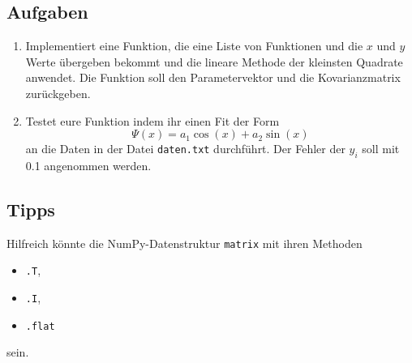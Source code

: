 \documentclass{scrartcl}
\begin{document}
\subsection*{Aufgaben}
\begin{enumerate}
    \item Implementiert eine Funktion, die eine Liste von Funktionen und die $x$ und $y$ Werte übergeben bekommt und die lineare Methode der kleinsten Quadrate anwendet. 
        Die Funktion soll den Parametervektor und die Kovarianzmatrix zurückgeben.
    \item Testet eure Funktion indem ihr einen Fit der Form
        \begin{equation}
            \Psi(x) = a_1 \cos(x) + a_2 \sin(x)
        \end{equation}
        an die Daten in der Datei \texttt{daten.txt} durchführt.
        Der Fehler der $y_i$ soll mit \num{0.1} angenommen werden.
\end{enumerate}

\subsection*{Tipps}
Hilfreich könnte die NumPy-Datenstruktur \texttt{matrix} mit ihren Methoden 
\begin{itemize}
    \item \texttt{.T},
    \item \texttt{.I},
    \item \texttt{.flat}
\end{itemize}
sein.
\end{document}
